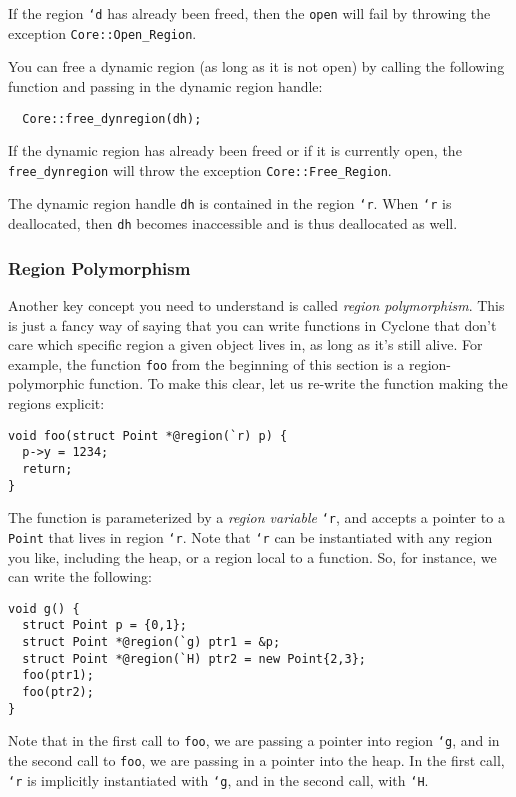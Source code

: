 If the region \texttt{`d} has already been freed, then the 
\texttt{open} will fail by throwing the exception \texttt{Core::Open_Region}.

You can free a dynamic region (as long as it is not open) by 
calling the following function and passing in the dynamic
region handle:
\begin{verbatim}
  Core::free_dynregion(dh);
\end{verbatim}
If the dynamic region has already been freed or if it is currently
open, the \texttt{free_dynregion} will throw the exception
\texttt{Core::Free_Region}.

The dynamic region handle \texttt{dh} is contained in the region
\texttt{`r}.  When \texttt{`r} is deallocated, then \texttt{dh}
becomes inaccessible and is thus deallocated as well.  

\subsubsection*{Region Polymorphism}

Another key concept you need to understand is called
\emph{region polymorphism}.  This is just a fancy way of saying
that you can write functions in Cyclone that don't care which
specific region a given object lives in, as long as it's still
alive.  For example, the function \texttt{foo} from the beginning
of this section is a region-polymorphic function.  To make this
clear, let us re-write the function making the regions explicit:
\begin{verbatim}
void foo(struct Point *@region(`r) p) {
  p->y = 1234;
  return;
}
\end{verbatim}
The function is parameterized by a \emph{region variable} \texttt{`r},
and accepts a pointer to a \texttt{Point} that lives in region
\texttt{`r}.  Note that \texttt{`r} can be instantiated with any
region you like, including the heap, or a region local to a function.
So, for instance, we can write the following:
\begin{verbatim}
void g() {
  struct Point p = {0,1};
  struct Point *@region(`g) ptr1 = &p;
  struct Point *@region(`H) ptr2 = new Point{2,3};
  foo(ptr1);
  foo(ptr2);
}
\end{verbatim}
Note that in the first call to \texttt{foo}, we are passing
a pointer into region \texttt{`g}, and in the second call to 
\texttt{foo}, we are passing in a pointer into the heap.  In
the first call, \texttt{`r} is implicitly instantiated with
\texttt{`g}, and in the second call, with \texttt{`H}.  

